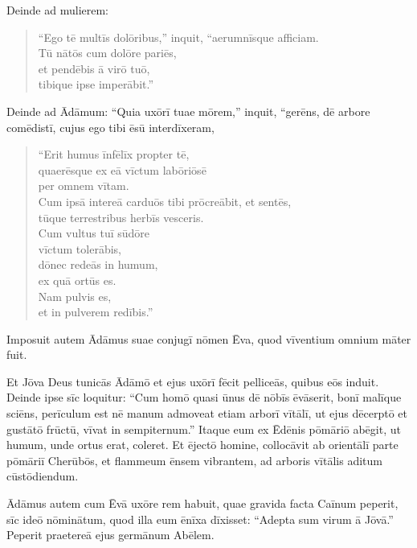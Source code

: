 \Versus Deinde ad mulierem:

\begin{verse}
\begin{patverse*}
 ``Ego tē multīs dolōribus,'' inquit, ``aerumnīsque afficiam. \\
 Tū nātōs cum dolōre pariēs, \\
 et pendēbis ā virō tuō, \\
 tibique ipse imperābit.''
\end{patverse*}
\end{verse}

\Versus Deinde ad Ādāmum: ``Quia uxōrī tuae mōrem,'' inquit, ``gerēns, dē arbore comēdistī, cujus ego tibi ēsū interdīxeram,

\begin{verse}
\begin{patverse*}
 ``Erit humus īnfēlīx propter tē, \\
 quaerēsque ex eā vīctum labōriōsē \\
 per omnem vītam.\\
\Versus Cum ipsā intereā carduōs tibi prōcreābit, et sentēs, \\
 tūque terrestribus herbīs vesceris.\\
\Versus Cum vultus tuī sūdōre \\
 vīctum tolerābis, \\
 dōnec redeās in humum, \\
 ex quā ortūs es. \\
 Nam pulvis es, \\
 et in pulverem redībis.''
\end{patverse*}
\end{verse}

\Versus Imposuit autem Ādāmus suae conjugī nōmen Ēva, quod vīventium omnium māter fuit.

\Versus Et Jōva Deus tunicās Ādāmō et ejus uxōrī fēcit pelliceās, quibus eōs induit.
\Versus Deinde ipse sīc loquitur: ``Cum homō quasi ūnus dē nōbīs ēvāserit, bonī malīque sciēns, perīculum est nē manum admoveat etiam arborī vītālī, ut ejus dēcerptō et gustātō frūctū, vīvat in sempiternum.''
\Versus Itaque eum ex Ēdēnis pōmāriō abēgit, ut humum, unde ortus erat, coleret. Et ējectō homine, collocāvit ab orientālī parte pōmāriī Cherūbōs, et flammeum ēnsem vibrantem, ad arboris vītālis aditum cūstōdiendum.




\Caput
\Versus Ādāmus autem cum Ēvā uxōre rem habuit, quae gravida facta Caīnum peperit, sīc ideō nōminātum, quod illa eum ēnīxa dīxisset: ``Adepta sum virum ā Jōvā.''
\Versus Peperit praetereā ejus germānum Abēlem.

